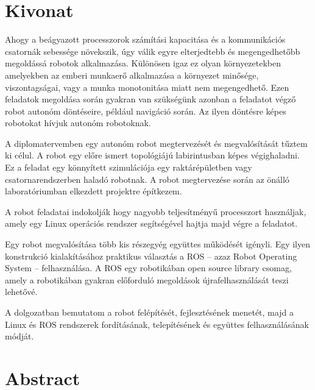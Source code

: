 \setcounter{page}{1}

\selecthungarian

\chapter*{Kivonat}
Ahogy a beágyazott processzorok számítási kapacitása és a kommunikációs csatornák
sebessége növekszik, úgy válik egyre elterjedtebb és megengedhetőbb megoldássá
robotok alkalmazása. Különösen igaz ez olyan környezetekben amelyekben az emberi
munkaerő alkalmazása a környezet minősége, viszontagságai, vagy a munka
monotonitása miatt nem megengedhető. Ezen feladatok megoldása során gyakran van
szükségünk azonban a feladatot végző robot autonóm döntéseire, például navigáció
során. Az ilyen döntésre képes robotokat hívjuk autonóm robotoknak.

A diplomatervemben egy autonóm robot megtervezését és megvalósítását tűztem ki
célul. A robot egy előre ismert topológiájú labirintusban képes végighaladni. Ez
a feladat egy könnyített szimulációja egy raktárépületben vagy csatornarendszerben
haladó robotnak. A robot megtervezése során az önálló laboratóriumban elkezdett
projektre építkezem.

A robot feladatai indokolják hogy nagyobb teljesítményű processzort használjak,
amely egy Linux operációs rendszer segítségével hajtja majd végre a feladatot.

Egy robot megvalósítása több kis részegyég együttes működését igényli. Egy ilyen
konstrukció kialakításához praktikus választás a ROS -- azaz Robot Operating
System -- felhasználása. A ROS egy robotikában open source library csomag, amely
a robotikában gyakran előforduló megoldások újrafelhasználását teszi lehetővé.

A dolgozatban bemutatom a robot felépítését, fejlesztésének menetét, majd a
Linux és ROS rendszerek fordításának, telepítésének és együttes felhasználásának módját.

\vfill
\selectenglish


\chapter*{Abstract}

